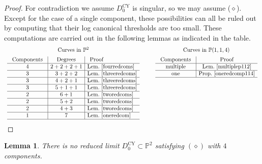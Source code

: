 \documentclass[JEP,XML,SOM,Unicode,NoFloatCountersInSection,published]{cedram}
\theoremstyle{plain}
\newtheorem{lemma}[theorem]{Lemma}
\theoremstyle{definition}
\newcommand\PP{{\mathbb{P}}}
\newcommand\Dcyo{{D^{\mathrm{CY}}_0}}
\begin{document}
\begin{proof}
For contradiction we assume $\Dcyo$ is singular, so we may assume ($\diamond$). Except for the case of a single component, these possibilities can all be ruled out by computing that their log canonical thresholds are too small. These computations are carried out in the following lemmas as indicated in the table.\smaller
\[\arraycolsep4.5pt
\begin{array}{ccc}
\text{Curves in $\PP^2$} &\quad& \text{Curves in $\PP(1,1,4)$}\\[5pt]
\begin{array}[t]{c|c|l}
\begin{array}{c}\text{Components}\end{array}&\begin{array}{c}\text{Degrees}\end{array}&\begin{array}{c}\text{Proof}\end{array}\\\hline
4&2+2+2+1&\text{Lem.~\ref{fourredcoms}}\\\hline
3&3+2+2&\text{Lem.~\ref{threeredcoms}}\\\hline
3&4+2+1&\text{Lem.~\ref{threeredcoms}}\\\hline
3&5+1+1&\text{Lem.~\ref{threeredcoms}}\\\hline
2&6+1&\text{Lem.~\ref{tworedcoms}}\\\hline
2&5+2&\text{Lem.~\ref{tworedcoms}}\\\hline
2&4+3&\text{Lem.~\ref{tworedcoms}}\\\hline
1&7&\text{Lem.~\ref{oneredcom}}\\\hline
\end{array}&& \begin{array}[t]{c|c}
\begin{array}{c}\text{Components}\end{array}&\begin{array}{c}\text{Proof}\end{array}\\\hline
\text{multiple}&\text{Lem.~\ref{multiplep112}}\\\hline
\text{one}&\text{Prop.~\ref{oneredcomp114}}\\\hline
\end{array}
\end{array}
\]
\end{proof}

\begin{lemma}\label{fourredcoms}
There is no reduced limit $\Dcyo\subset \PP^2$ satisfying $(\diamond)$ with $4$ components.
\end{lemma}
\end{document}
